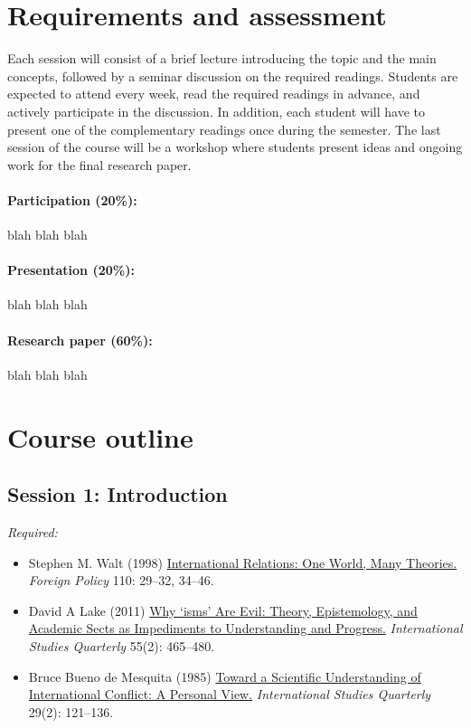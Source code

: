 \documentclass[12pt, a4paper]{article}
\begin{document}
\section{Requirements and assessment}

Each session will consist of a brief lecture introducing the topic and the main concepts, followed by a seminar discussion on the required readings. Students are expected to attend every week, read the required readings in advance, and actively participate in the discussion.
In addition, each student will have to present one of the complementary readings once during the semester.
The last session of the course will be a workshop where students present ideas and ongoing work for the final research paper.

\paragraph{Participation (20\%):}

blah blah blah

\paragraph{Presentation (20\%):}

blah blah blah

\paragraph{Research paper (60\%):}

blah blah blah

\section{Course outline}


\subsection*{Session 1: Introduction}

\noindent\textit{Required:}

\begin{itemize}
  \item Stephen M. Walt (1998) \href{https://doi.org/10.2307/1149275}{International Relations: One World, Many Theories.} \textit{Foreign Policy} 110: 29--32, 34--46.
  \item David A Lake (2011) \href{https://academic.oup.com/isq/article/55/2/465/1796473}{Why `isms' Are Evil: Theory, Epistemology, and Academic Sects as Impediments to Understanding and Progress.} \textit{International Studies Quarterly} 55(2): 465--480.
  \item Bruce Bueno de Mesquita (1985) \href{https://doi.org/10.2307/2600500}{Toward a Scientific Understanding of International Conflict: A Personal View.} \textit{International Studies Quarterly} 29(2): 121--136.
\end{itemize}
\end{document}
